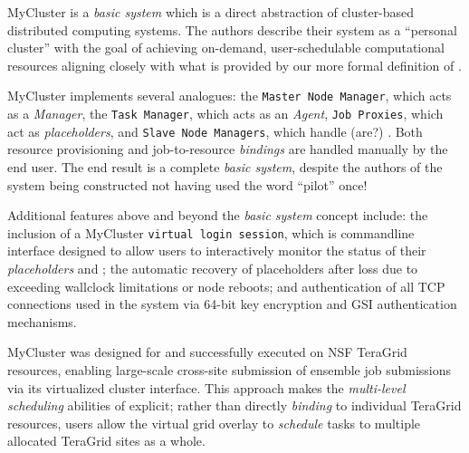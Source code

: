 \documentclass{sig-alternate}
\begin{document}
MyCluster is a \textit{basic \pilotjob system} which is a direct
abstraction of cluster-based distributed computing systems.
The authors describe their system
as a ``personal cluster'' with the goal of achieving on-demand,
user-schedulable computational resources aligning closely with what is
provided by our more formal definition of \pilotjobs.

MyCluster implements several \pilotjob analogues: the \texttt{Master
  Node Manager}, which acts as a \textit{\pilotjob Manager}, the
\texttt{Task Manager}, which acts as an \textit{\pilotjob Agent},
\texttt{Job Proxies}, which act as \textit{placeholders}, and
\texttt{Slave Node Managers}, which handle (are?) \textit{\pilotjob
  \cus}.  Both resource provisioning and job-to-resource \textit{bindings}
are handled manually by the end user.
The end result is a complete \textit{basic \pilotjob system}, despite the
authors of the system being constructed not having used the word ``pilot''
once!~\cite{1652061}  

Additional features above and beyond the \textit{basic \pilotjob system}
concept include: the inclusion of a MyCluster
\texttt{virtual login session}, which
is commandline interface designed to allow users to interactively
monitor the status of their \textit{placeholders} and \textit{\cus};
the automatic recovery of placeholders after loss due to exceeding wallclock
limitations or node reboots; and authentication of all TCP
connections used in the system via 64-bit key encryption and
GSI authentication mechanisms.

MyCluster was designed for and successfully executed on NSF TeraGrid
resources, enabling large-scale cross-site submission of ensemble
job submissions via its virtualized cluster interface.  
This approach makes the \textit{multi-level scheduling} abilities
of \pilotjobs explicit; rather than directly \textit{binding}
to individual TeraGrid resources, users allow the virtual grid
overlay to \textit{schedule} tasks to multiple allocated TeraGrid sites
as a whole.
 

\end{document}
